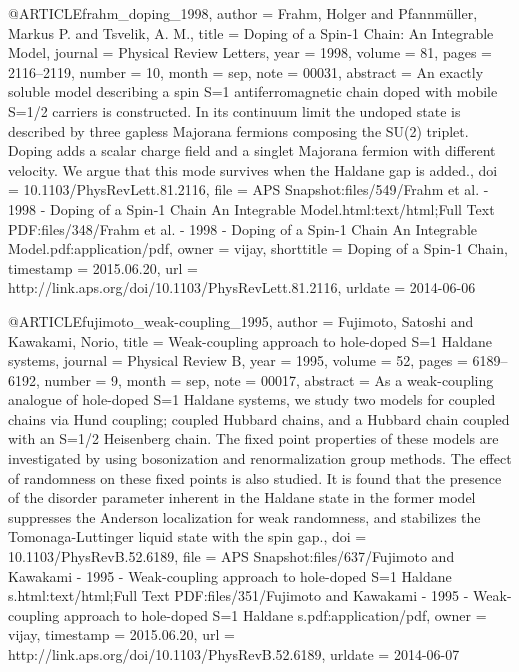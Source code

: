 @ARTICLE{frahm_doping_1998,
  author = {Frahm, Holger and Pfannmüller, Markus P. and Tsvelik, A. M.},
  title = {Doping of a {Spin}-1 {Chain}: {An} {Integrable} {Model}},
  journal = {Physical Review Letters},
  year = {1998},
  volume = {81},
  pages = {2116--2119},
  number = {10},
  month = sep,
  note = {00031},
  abstract = {An exactly soluble model describing a spin S=1 antiferromagnetic chain
	doped with mobile S=1/2 carriers is constructed. In its continuum
	limit the undoped state is described by three gapless Majorana fermions
	composing the SU(2) triplet. Doping adds a scalar charge field and
	a singlet Majorana fermion with different velocity. We argue that
	this mode survives when the Haldane gap is added.},
  doi = {10.1103/PhysRevLett.81.2116},
  file = {APS Snapshot:files/549/Frahm et al. - 1998 - Doping of a Spin-1 Chain An Integrable Model.html:text/html;Full Text PDF:files/348/Frahm et al. - 1998 - Doping of a Spin-1 Chain An Integrable Model.pdf:application/pdf},
  owner = {vijay},
  shorttitle = {Doping of a {Spin}-1 {Chain}},
  timestamp = {2015.06.20},
  url = {http://link.aps.org/doi/10.1103/PhysRevLett.81.2116},
  urldate = {2014-06-06}
}

@ARTICLE{fujimoto_weak-coupling_1995,
  author = {Fujimoto, Satoshi and Kawakami, Norio},
  title = {Weak-coupling approach to hole-doped {S}=1 {Haldane} systems},
  journal = {Physical Review B},
  year = {1995},
  volume = {52},
  pages = {6189--6192},
  number = {9},
  month = sep,
  note = {00017},
  abstract = {As a weak-coupling analogue of hole-doped S=1 Haldane systems, we
	study two models for coupled chains via Hund coupling; coupled Hubbard
	chains, and a Hubbard chain coupled with an S=1/2 Heisenberg chain.
	The fixed point properties of these models are investigated by using
	bosonization and renormalization group methods. The effect of randomness
	on these fixed points is also studied. It is found that the presence
	of the disorder parameter inherent in the Haldane state in the former
	model suppresses the Anderson localization for weak randomness, and
	stabilizes the Tomonaga-Luttinger liquid state with the spin gap.},
  doi = {10.1103/PhysRevB.52.6189},
  file = {APS Snapshot:files/637/Fujimoto and Kawakami - 1995 - Weak-coupling approach to hole-doped S=1 Haldane s.html:text/html;Full Text PDF:files/351/Fujimoto and Kawakami - 1995 - Weak-coupling approach to hole-doped S=1 Haldane s.pdf:application/pdf},
  owner = {vijay},
  timestamp = {2015.06.20},
  url = {http://link.aps.org/doi/10.1103/PhysRevB.52.6189},
  urldate = {2014-06-07}
}

